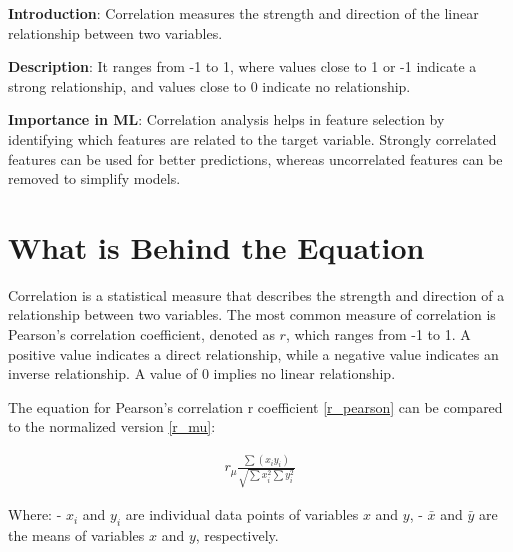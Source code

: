 \documentclass[
  12 pt,
  a4paper,
]{book}
\numberwithin{equation}{section}
\theoremstyle{plain}      %
\theoremstyle{definition} %
\theoremstyle{remark}     %
\theoremstyle{note}         %
\begin{document}
\hfill\break
\textbf{Introduction}: Correlation measures the strength and direction
of the linear relationship between two variables.

\textbf{Description}: It ranges from -1 to 1, where values close to 1 or
-1 indicate a strong relationship, and values close to 0 indicate no
relationship.

\textbf{Importance in ML}: Correlation analysis helps in feature
selection by identifying which features are related to the target
variable. Strongly correlated features can be used for better
predictions, whereas uncorrelated features can be removed to simplify
models.

\vspace*{\fill}

\newpage

\hypertarget{what-is-behind-the-equation-4}{%
\section{What is Behind the
Equation}\label{what-is-behind-the-equation-4}}

Correlation is a statistical measure that describes the strength and
direction of a relationship between two variables. The most common
measure of correlation is Pearson's correlation coefficient, denoted as
\(r\), which ranges from -1 to 1. A positive value indicates a direct
relationship, while a negative value indicates an inverse relationship.
A value of 0 implies no linear relationship.

The equation for Pearson's correlation r coefficient \ref{r_pearson} can
be compared to the normalized version \ref{r_mu}:

\begin{align}\label{r_mu}
r_{\mu} \frac{\sum \left(x_i y_i\right)}{\sqrt{\sum x_i^2 \sum y_i^2}}
\end{align}

Where: - \(x_i\) and \(y_i\) are individual data points of variables
\(x\) and \(y\), - \(\bar{x}\) and \(\bar{y}\) are the means of
variables \(x\) and \(y\), respectively.
\end{document}
